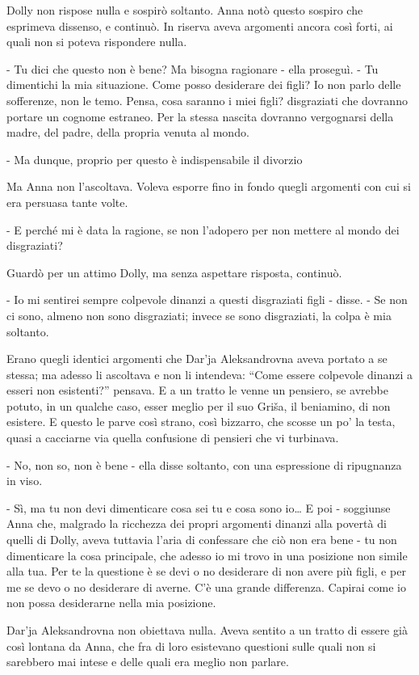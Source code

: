 Dolly non rispose nulla e sospirò soltanto. Anna notò questo sospiro che esprimeva dissenso, e continuò. In riserva aveva argomenti ancora così forti, ai quali non si poteva rispondere nulla. 

- Tu dici che questo non è bene? Ma bisogna ragionare - ella proseguì. - Tu dimentichi la mia situazione. Come posso desiderare dei figli? Io non parlo delle sofferenze, non le temo. Pensa, cosa saranno i miei figli? disgraziati che dovranno portare un cognome estraneo. Per la stessa nascita dovranno vergognarsi della madre, del padre, della propria venuta al mondo. 

- Ma dunque, proprio per questo è indispensabile il divorzio 

Ma Anna non l'ascoltava. Voleva esporre fino in fondo quegli argomenti con cui si era persuasa tante volte. 

- E perché mi è data la ragione, se non l'adopero per non mettere al mondo dei disgraziati? 

Guardò per un attimo Dolly, ma senza aspettare risposta, continuò. 

- Io mi sentirei sempre colpevole dinanzi a questi disgraziati figli - disse. - Se non ci sono, almeno non sono disgraziati; invece se sono disgraziati, la colpa è mia soltanto. 

Erano quegli identici argomenti che Dar'ja Aleksandrovna aveva portato a se stessa; ma adesso li ascoltava e non li intendeva: ``Come essere colpevole dinanzi a esseri non esistenti?'' pensava. E a un tratto le venne un pensiero, se avrebbe potuto, in un qualche caso, esser meglio per il suo Griša, il beniamino, di non esistere. E questo le parve così strano, così bizzarro, che scosse un po' la testa, quasi a cacciarne via quella confusione di pensieri che vi turbinava. 

- No, non so, non è bene - ella disse soltanto, con una espressione di ripugnanza in viso. 

- Sì, ma tu non devi dimenticare cosa sei tu e cosa sono io\ldots{} E poi - soggiunse Anna che, malgrado la ricchezza dei propri argomenti dinanzi alla povertà di quelli di Dolly, aveva tuttavia l'aria di confessare che ciò non era bene - tu non dimenticare la cosa principale, che adesso io mi trovo in una posizione non simile alla tua. Per te la questione è se devi o no desiderare di non avere più figli, e per me se devo o no desiderare di averne. C'è una grande differenza. Capirai come io non possa desiderarne nella mia posizione. 

Dar'ja Aleksandrovna non obiettava nulla. Aveva sentito a un tratto di essere già così lontana da Anna, che fra di loro esistevano questioni sulle quali non si sarebbero mai intese e delle quali era meglio non parlare. 

